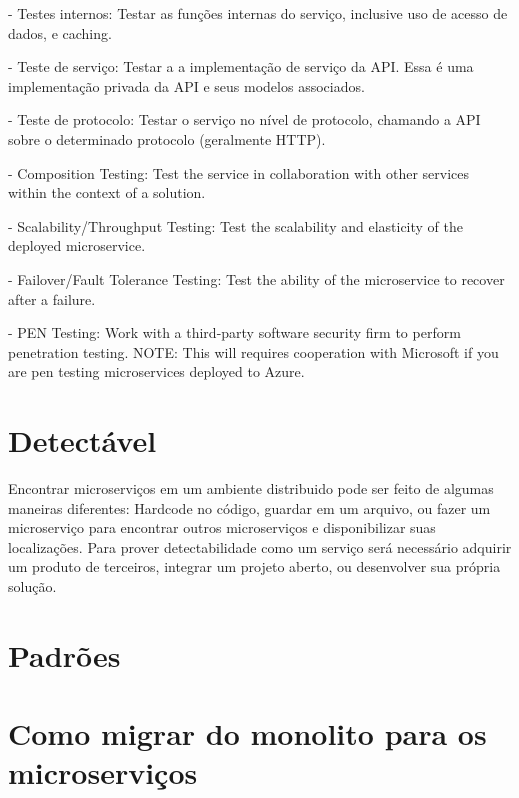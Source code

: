 - Testes internos: Testar as funções internas do serviço, inclusive uso de acesso de dados, e caching.

- Teste de serviço: Testar a a implementação de serviço da API. Essa é uma implementação privada da API e seus modelos associados.

- Teste de protocolo: Testar o serviço no nível de protocolo, chamando a API sobre o determinado protocolo (geralmente HTTP).

- Composition Testing: Test the service in collaboration with other services within the context of a solution.

- Scalability/Throughput Testing: Test the scalability and elasticity of the deployed microservice.

- Failover/Fault Tolerance Testing: Test the ability of the microservice to recover after a failure.

- PEN Testing: Work with a third-party software security firm to perform penetration testing. NOTE: This will requires cooperation with Microsoft if you are pen testing microservices deployed to Azure.

\section{Detectável}

Encontrar microserviços em um ambiente distribuido pode ser feito de algumas maneiras diferentes: Hardcode no código, guardar em um arquivo, ou fazer um microserviço para encontrar outros microserviços e disponibilizar suas localizações. Para prover detectabilidade como um serviço será necessário adquirir um produto de terceiros, integrar um projeto aberto, ou desenvolver sua própria solução.

\section{Padrões}

\lipsum[1-2]

\section{Como migrar do monolito para os microserviços}

\lipsum[3-4]